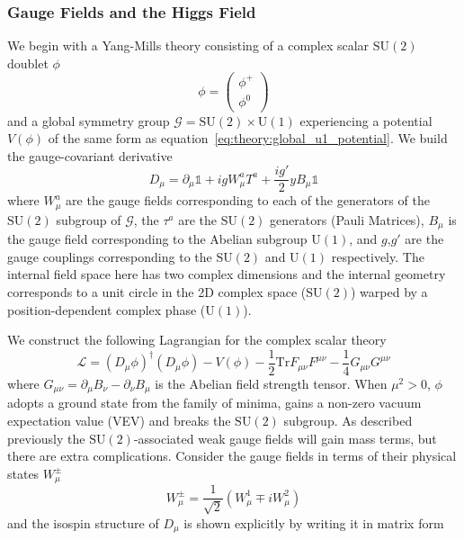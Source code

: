 \subsubsection{Gauge Fields and the Higgs Field}
We begin with a Yang-Mills theory consisting of a complex scalar $\mathrm{SU}(2)$ doublet $\phi$ 
\begin{equation}
    \label{eq:theory:higgs_doublet}
    \phi = \begin{pmatrix}
        \phi^{+} \\
        \phi^{0}
    \end{pmatrix}
\end{equation}
and a global symmetry group $\mathcal{G}=\mathrm{SU}(2)\times\mathrm{U}(1)$ experiencing a potential $V(\phi)$ of the same form as equation~\ref{eq:theory:global_u1_potential}. We build the gauge-covariant derivative 
\begin{equation}
    \label{eq:theory:electroweak_cov_deriv}
    D_{\mu} = \partial_{\mu}\mathbb{1} + {ig}W_{\mu}^{a}T^{a} + \frac{ig'}{2}yB_{\mu}\mathbb{1}
\end{equation}
where $W_{\mu}^{a}$ are the gauge fields corresponding to each of the generators of the $\mathrm{SU}(2)$ subgroup of $\mathcal{G}$, the $\tau^{a}$ are the $\mathrm{SU}(2)$ generators (Pauli Matrices), $B_{\mu}$ is the gauge field corresponding to the Abelian subgroup $\mathrm{U}(1)$, and $g$,$g'$ are the gauge couplings corresponding to the $\mathrm{SU}(2)$ and $\mathrm{U}(1)$ respectively. 
The internal field space here has two complex dimensions and the internal geometry corresponds to a unit circle in the 2D complex space ($\mathrm{SU}(2)$) warped by a position-dependent complex phase ($\mathrm{U}(1)$).


We construct the following Lagrangian for the complex scalar theory
\begin{equation}
    \label{eq:theory:electroweak_scalar_lagrangian}
    \mathcal{L} = (D_{\mu}\phi)^{\dag}(D_{\mu}\phi) - V(\phi) - \frac{1}{2}\mathrm{Tr}F_{\mu\nu}F^{\mu\nu} - \frac{1}{4}G_{\mu\nu}G^{\mu\nu}
\end{equation}
where $G_{\mu\nu} = \partial_{\mu}B_{\nu} - \partial_{\nu}B_{\mu}$ is the Abelian field strength tensor.
When $\mu^{2} > 0$, $\phi$ adopts a ground state from the family of minima, gains a non-zero vacuum expectation value (VEV) and breaks the $\mathrm{SU}(2)$ subgroup. 
As described previously the $\mathrm{SU}(2)$-associated weak gauge fields will gain mass terms, but there are extra complications. Consider the gauge fields in terms of their physical states $W_{\mu}^{\pm}$
\begin{equation}
    \label{eq:theory:physical_W_states}
    W^{\pm}_{\mu} = \frac{1}{\sqrt{2}}(W^{1}_{\mu}{\mp}iW^{2}_{\mu})
\end{equation}
and the isospin structure of $D_{\mu}$ is shown explicitly by writing it in matrix form

